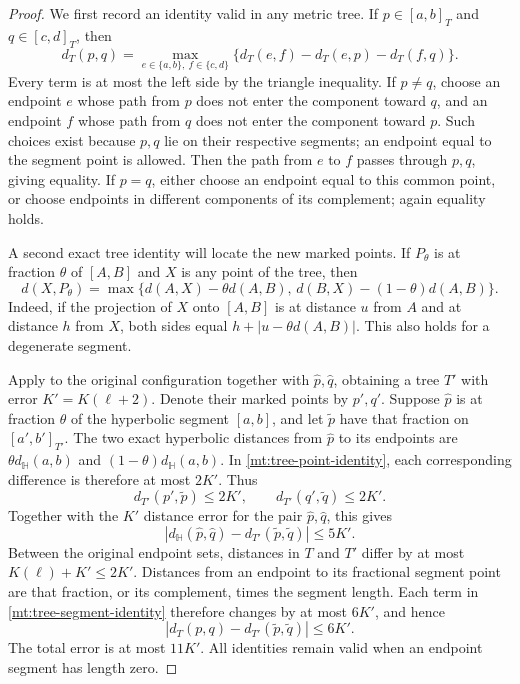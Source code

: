 \begin{proof}
We first record an identity valid in any metric tree.  If
\(p\in[a,b]_T\) and \(q\in[c,d]_T\), then
\begin{equation}\label{mt:tree-segment-identity}
 d_T(p,q)=\max_{e\in\{a,b\},\ f\in\{c,d\}}
 \{d_T(e,f)-d_T(e,p)-d_T(f,q)\}.
\end{equation}
Every term is at most the left side by the triangle inequality.
If \(p\ne q\), choose an endpoint \(e\) whose path from \(p\)
does not enter the component toward \(q\), and an endpoint \(f\)
whose path from \(q\) does not enter the component toward \(p\).
Such choices exist because \(p,q\) lie on their respective segments;
an endpoint equal to the segment point is allowed.  Then the path
from \(e\) to \(f\) passes through \(p,q\), giving equality.  If
\(p=q\), either choose an endpoint equal to this common point, or
choose endpoints in different components of its complement; again
equality holds.

A second exact tree identity will locate the new marked points.
If $P_\theta$ is at fraction $\theta$ of $[A,B]$ and $X$ is any
point of the tree, then
\begin{equation}\label{mt:tree-point-identity}
 d(X,P_\theta)=\max\{d(A,X)-\theta d(A,B),\,
                     d(B,X)-(1-\theta)d(A,B)\}.
\end{equation}
Indeed, if the projection of $X$ onto $[A,B]$ is at distance $u$
from $A$ and at distance $h$ from $X$, both sides equal
$h+|u-\theta d(A,B)|$.  This also holds for a degenerate segment.

Apply  to the original configuration together
with $\widehat p,\widehat q$, obtaining a tree $T'$ with error
$K'=K(\ell+2)$.  Denote their marked points by $p',q'$.  Suppose
$\widehat p$ is at fraction $\theta$ of the hyperbolic segment
$[a,b]$, and let $\widetilde p$ have that fraction on
$[a',b']_{T'}$.  The two exact hyperbolic distances from $\widehat p$
to its endpoints are $\theta d_{\mathbb H}(a,b)$ and
$(1-\theta)d_{\mathbb H}(a,b)$.  In
\eqref{mt:tree-point-identity}, each corresponding difference is
therefore at most $2K'$.  Thus
\[
 d_{T'}(p',\widetilde p)\le2K',\qquad
 d_{T'}(q',\widetilde q)\le2K'.
\]
Together with the $K'$ distance error for the pair
$\widehat p,\widehat q$, this gives
\[
 |d_{\mathbb H}(\widehat p,\widehat q)
       -d_{T'}(\widetilde p,\widetilde q)|\le5K'.
\]
Between the original endpoint sets, distances in $T$ and $T'$
differ by at most $K(\ell)+K'\le2K'$.  Distances from an endpoint
to its fractional segment point are that fraction, or its complement,
times the segment length.  Each term in
\eqref{mt:tree-segment-identity} therefore changes by at most
$6K'$, and hence
\[
 |d_T(p,q)-d_{T'}(\widetilde p,\widetilde q)|\le6K'.
\]
The total error is at most $11K'$.  All identities remain valid when
an endpoint segment has length zero.
\end{proof}

